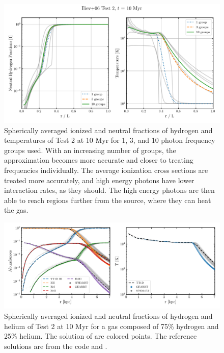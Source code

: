\begin{figure}
 \centering
 \includegraphics[width=\textwidth]{figures/RHD/Iliev2/photon_groups.png}%
 \caption{
Spherically averaged ionized and neutral fractions of hydrogen and temperatures of Test 2 at 10
Myr for 1, 3, and 10 photon frequency groups used. With an increasing number of groups, the
approximation becomes more accurate and closer to treating frequencies individually. The average
ionization cross sections are treated more accurately, and high energy photons have lower
interaction rates, as they should. The high energy photons are then able to reach regions further
from the source, where they can heat the gas.
 }
 \label{fig:iliev2-photon-groups}
\end{figure}




\begin{figure}
 \centering
 \includegraphics[width=\textwidth]{figures/RHD/Iliev2/HHe.png}%
 \caption{
Spherically averaged ionized and neutral fractions of hydrogen and helium of Test 2 at 10 Myr for
a gas composed of 75\% hydrogen and 25\% helium. The solution of \GEARRT are colored points. The
reference solutions are from the  code
\citep[][dashed lines]{pawlikMultifrequencyThermallyCoupled2011} and 
\citep[][gray points]{chanSmoothedParticleRadiation2021}.
}
 \label{fig:iliev2-HHe}
\end{figure}



